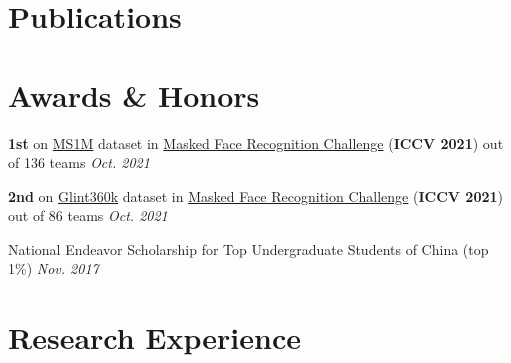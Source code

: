 \documentclass[a4,10pt]{article}
\begin{document}
\section{Publications} 
\renewcommand\refname{\vskip -1.5em}
\nocite{*}
\printbibliography[heading=none]
\vspace{-0.5cm}


\section{Awards \& Honors}
\noindent \textbf{1st} on \href {https://arxiv.org/abs/1607.08221} {MS1M} dataset in \href {https://arxiv.org/abs/2108.08191} {Masked Face Recognition Challenge} (\textbf{ICCV 2021}) out of 136 teams \hfill{\textit{Oct. 2021}}

\noindent \textbf{2nd} on \href {https://paperswithcode.com/dataset/glint360k} {Glint360k} dataset in \href {https://arxiv.org/abs/2108.08191} {Masked Face Recognition Challenge} (\textbf{ICCV 2021}) out of 86 teams \hfill{\textit{Oct. 2021}}

\noindent National Endeavor Scholarship for Top Undergraduate Students of China (top 1\%) \hfill{\textit{Nov. 2017}}

\vspace{-0.2cm}
    
\section{Research Experience} %
\end{document}

